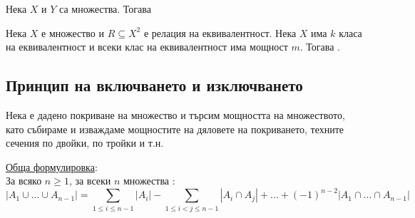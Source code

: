 \begin{principle}[на умножението]
    Нека \(X\) и \(Y\) са множества. Тогава 
\end{principle}

\begin{principle}[на делението]
    Нека \(X\) е множество и \(R \subseteq X^2\) е релация на еквивалентност. Нека \(X\) има \(k\) класа 
    на еквивалентност и всеки клас на еквивалентност има мощност \(m\). Тогава 
    .
\end{principle}

\subsection{Принцип на включването и изключването}
\begin{principle}
    Нека е дадено покриване на множество и търсим мощността на множеството, като събираме и изваждаме 
    мощностите на дяловете на покриването, техните сечения по двойки, по тройки и т.н.

    \underline{Обща формулировка}: \\
    За всяко \(n \ge 1\), за всеки \(n\) множества : \\
    \begin{equation}
        |A_1 \cup ... \cup A_{n - 1}| = \sum_{1 \le i \le n - 1} |A_i| - \sum_{1 \le i < j \le n - 1} |A_i \cap A_j| 
        + ... + (-1)^{n - 2}|A_1 \cap ... \cap A_{n - 1}|
    \end{equation}
\end{principle}

